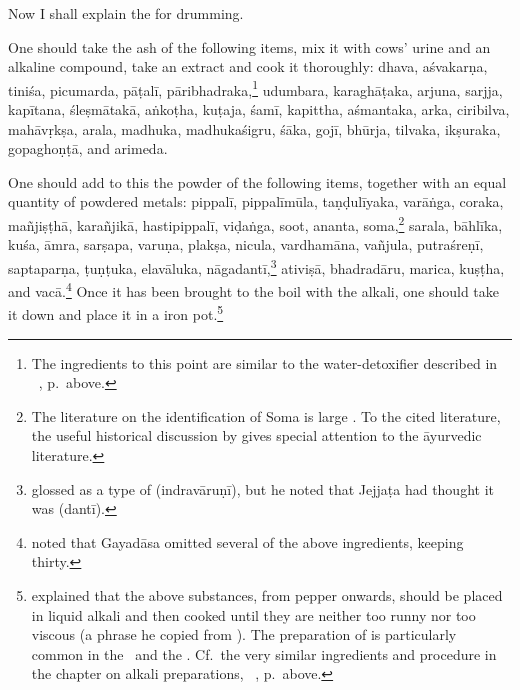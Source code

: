 \begin{translation}
    
    \item[1] Now I shall explain the 
for drumming.
    
    \item[3] 
     One should take the ash of the following items, mix it with 
     cows' urine and an alkaline compound, take an extract and cook 
     it thoroughly:
     \gls{dhava},
     \gls{aśvakarṇa},
     \gls{tiniśa}, 
     \gls{picumarda}, 
     \gls{pāṭalī}, 
     \gls{pāribhadraka},\footnote{\label{drum-detox}The ingredients to this point
         are similar to the water-detoxifier described in \SS\ , 
         p.\,\pageref{water-detox} above.}
     \gls{udumbara}, 
     \gls{karaghāṭaka}, 
     \gls{arjuna},
     \gls{sarjja}, 
     \gls{kapītana}, 
     \gls{śleṣmātakā}, 
     \gls{aṅkoṭha},
     \gls{kuṭaja},
     \gls{śamī}, 
     \gls{kapittha},
     \gls{aśmantaka},
     \gls{arka},
     \gls{ciribilva}, 
     \gls{mahāvṛkṣa}, 
     \gls{arala}, 
     \gls{madhuka},
     \gls{madhukaśigru}, 
     \gls{śāka},
     \gls{gojī}, 
     \gls{bhūrja}, 
     \gls{tilvaka},
     \gls{ikṣuraka},
     \gls{gopaghoṇṭā}, 
     and
     \gls{arimeda}.
     
One should add to this the powder of the following items, together
with an equal quantity of powdered metals: \gls{pippalī},
\gls{pippalīmūla}, \gls{taṇḍulīyaka}, \gls{varāṅga}, \gls{coraka},
\gls{mañjiṣṭhā}, \gls{karañjikā}, \gls{hastipippalī}, \gls{viḍaṅga},
soot, \gls{ananta}, soma,\footnote{The literature on the identification of Soma is
    large \citep[passim]{wuja-2003}. To the cited literature, the useful
    historical discussion by \citet[449--455]{gvdb} gives special
    attention to the āyurvedic literature.} \gls{sarala}, \gls{bāhlīka},
    \gls{kuśa}, \gls{āmra}, \gls{sarṣapa}, \gls{varuṇa}, \gls{plakṣa},
    \gls{nicula}, \gls{vardhamāna}, \gls{vañjula}, \gls{putraśreṇī},
    \gls{saptaparṇa}, \gls{ṭuṇṭuka}, \gls{elavāluka},
    \gls{nāgadantī},\footnote{ glossed
         as a type of  (\gls{indravāruṇī}),
        but he noted that Jejjaṭa had thought it was 
        (\gls{dantī}).} \gls{ativiṣā}, \gls{bhadradāru}, \gls{marica},
        \gls{kuṣṭha}, and \gls{vacā}.\footnote{ noted
            that Gayadāsa omitted several of the above ingredients, keeping
            thirty.}  Once it has been brought to the boil with the alkali, one
            should take it down and place it in a iron
            pot.\footnote{\label{kṣārapāka2} explained that
                the above substances, from pepper onwards, should be placed in liquid
                alkali and then cooked until they are neither too runny nor too
                viscous (a phrase he copied from ).  The preparation
                of  is particularly common in the \SS\ and the \AH.  Cf.\
                the very similar ingredients and procedure in the chapter on alkali
                preparations, \SS\ \Su{1.11.11}{46--47}, p.\,\pageref{kṣārapāka}
                above.}
                

\end{translation}
